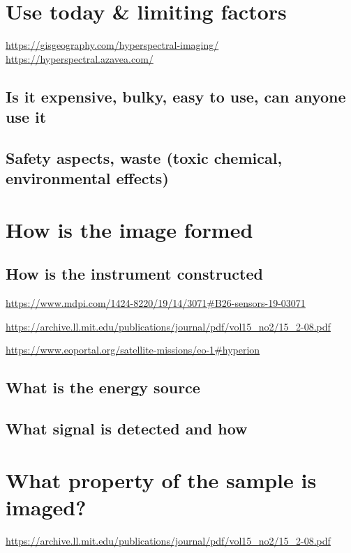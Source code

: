 \documentclass[a4paper]{article}
\begin{document}

\section{Use today \& limiting factors}

\url{https://gisgeography.com/hyperspectral-imaging/}
\url{https://hyperspectral.azavea.com/}



    \subsection*{Is it expensive, bulky, easy to use, can anyone use it}


    \subsection*{Safety aspects, waste (toxic chemical, environmental effects)}

\section{How is the image formed}

    \subsection*{How is the instrument constructed}
    \url{https://www.mdpi.com/1424-8220/19/14/3071#B26-sensors-19-03071}

    \url{https://archive.ll.mit.edu/publications/journal/pdf/vol15_no2/15_2-08.pdf}

    \url{https://www.eoportal.org/satellite-missions/eo-1#hyperion}

    \subsection*{What is the energy source}


    \subsection*{What signal is detected and how}



\section{What property of the sample is imaged?}
    \url{https://archive.ll.mit.edu/publications/journal/pdf/vol15_no2/15_2-08.pdf}
\end{document}
